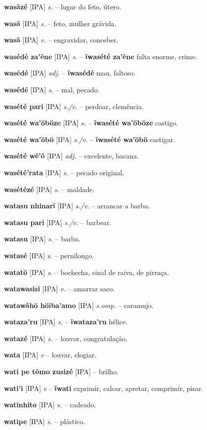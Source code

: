 \textbf{wasãzé} [IPA] \textit{s.} -- lugar do feto, útero.

\textbf{wasã} [IPA] \textit{s.} -- feto, mulher grávida.

\textbf{wasã} [IPA] \textit{v.} -- engravidar, conceber.

\textbf{wasédé za'ẽne} [IPA] \textit{s.} -- \textbf{ĩwasété za'ẽne} falta enorme, crime.

\textbf{wasédé} [IPA] \textit{adj.} -- \textbf{ĩwasédé} mau, faltoso.

\textbf{wasédé} [IPA] \textit{s.} -- mal, pecado.

\textbf{wasété pari} [IPA] \textit{s./v.} -- perdoar, clemência.

\textbf{wasété wa'öböze} [IPA] \textit{s.} -- \textbf{ĩwasété wa'öböze} castigo.

\textbf{wasété wa'öbö} [IPA] \textit{s./v.} -- \textbf{ĩwasété wa'öbö} castigar.

\textbf{wasété wẽ'õ} [IPA] \textit{adj.} -- excelente, bacana.

\textbf{wasété'rata} [IPA] \textit{s.} -- pecado original.

\textbf{wasétézé} [IPA] \textit{s.} -- maldade.

\textbf{watasu nhinarĩ} [IPA] \textit{s./v.} -- arrancar a barba.

\textbf{watasu pari} [IPA] \textit{s./v.} -- barbear.

\textbf{watasu} [IPA] \textit{s.} -- barba.

\textbf{watasé} [IPA] \textit{s.} -- pernilongo.

\textbf{watatö} [IPA] \textit{s.} -- bochecha, sinal de raiva, de pirraça.

\textbf{watawasisi} [IPA] \textit{v.} -- amarrar saco.

\textbf{watawãhö höiba'amo} [IPA] \textit{s.omp.} -- caramujo.

\textbf{wataza'ru} [IPA] \textit{s.} -- \textbf{ĩwataza'ru} hélice.

\textbf{watazé} [IPA] \textit{s.} -- louvor, congratulação.

\textbf{wata} [IPA] \textit{v} -- louvar, elogiar.

\textbf{wati pe tõmo zusizé} [IPA] \textit{} -- brilho.

\textbf{wati'i} [IPA] \textit{v} -- \textbf{ĩwati} exprimir, calcar, apretar, comprimir, pisar.

\textbf{watinhito} [IPA] \textit{s.} -- cadeado.

\textbf{watipe} [IPA] \textit{s.} -- plástico.

